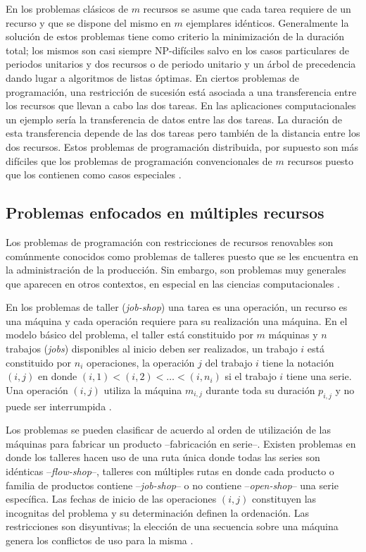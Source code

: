 \documentclass[spanish,draft,12pt,headsepline,footsepline,paper=letter]{scrreprt}
\begin{document}
En los problemas clásicos de $m$ recursos se asume que cada tarea requiere de un recurso y que se dispone del mismo en $m$ ejemplares idénticos. Generalmente la solución de estos problemas tiene como criterio la minimización de la duración total; los mismos son casi siempre NP-difíciles salvo en los casos particulares de periodos unitarios y dos recursos o de periodo unitario y un árbol de precedencia dando lugar a algoritmos de listas óptimas. En ciertos problemas de programación, una restricción de sucesión está asociada a una transferencia entre los recursos que llevan a cabo las dos tareas. En las aplicaciones computacionales un ejemplo sería la transferencia de datos entre las dos tareas. La duración de esta transferencia depende de las dos tareas pero también de la distancia entre los dos recursos. Estos problemas de programación distribuida, por supuesto son más difíciles que los problemas de programación convencionales de $m$ recursos puesto que los contienen como casos especiales \citep[p.~99]{gotha93les-problemes-dordonnancement}.

\subsection{Problemas enfocados en múltiples recursos}
\label{problemas_enfocados_multiples_recursos}

Los problemas de programación con restricciones de recursos renovables son comúnmente conocidos como problemas de talleres puesto que se les encuentra en la administración de la producción. Sin embargo, son problemas muy generales que aparecen en otros contextos, en especial en las ciencias computacionales \citep[p.~101]{gotha93les-problemes-dordonnancement}.

En los problemas de taller (\textit{job-shop}) una tarea es una operación, un recurso es una máquina y cada operación requiere para su realización una máquina. En el modelo básico del problema, el taller está constituido por $m$ máquinas y $n$ trabajos (\textit{jobs}) disponibles al inicio deben ser realizados, un trabajo $i$ está constituido por $n_i$ operaciones, la operación $j$ del trabajo $i$ tiene la notación $(i,j)$ en donde $(i,1)<(i,2)<\ldots<(i,n_i)$ si el trabajo $i$ tiene una serie. Una operación $(i,j)$ utiliza la máquina $m_{i,j}$ durante toda su duración $p_{i,j}$ y no puede ser interrumpida \citep[p.~102]{gotha93les-problemes-dordonnancement}.

Los problemas se pueden clasificar de acuerdo al orden de utilización de las máquinas para fabricar un producto –fabricación en serie–. Existen problemas en donde los talleres hacen uso de una ruta única donde todas las series son idénticas –\textit{flow-shop}–, talleres con múltiples rutas en donde cada producto o familia de productos contiene –\textit{job-shop}– o no contiene –\textit{open-shop}– una serie específica. Las fechas de inicio de las operaciones $(i,j)$ constituyen las incognitas del problema y su determinación definen la ordenación. Las restricciones son disyuntivas; la elección de una secuencia sobre una máquina genera los conflictos de uso para la misma \citep[p.~102]{gotha93les-problemes-dordonnancement}.
\end{document}
